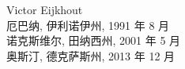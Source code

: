 \documentclass[letterpaper]{book}
\begin{document}
\begin{flushright}
 Victor Eijkhout\\
 厄巴纳, 伊利诺伊州, 1991 年 8 月\\
 诺克斯维尔, 田纳西州, 2001 年 5 月\\
 奥斯汀, 德克萨斯州, 2013 年 12 月
\end{flushright}
\end{document}
